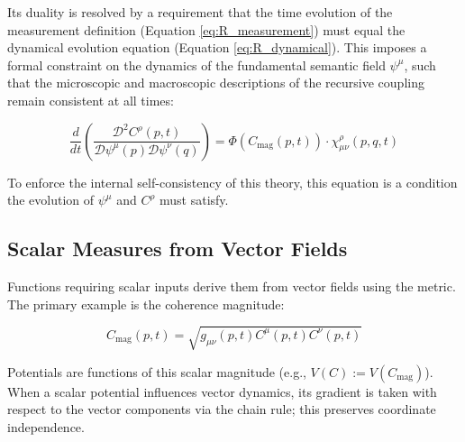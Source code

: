 Its duality is resolved by a requirement that the time evolution of the measurement definition (Equation \ref{eq:R_measurement}) must equal the dynamical evolution equation (Equation \ref{eq:R_dynamical}). This imposes a formal constraint on the dynamics of the fundamental semantic field \(\psi^\mu\), such that the microscopic and macroscopic descriptions of the recursive coupling remain consistent at all times:

\begin{equation}
\label{eq:R_consistency}
\frac{d}{dt} \left( \frac{\mathcal{D}^2 C^\rho(p,t)}{\mathcal{D} \psi^\mu(p) \mathcal{D} \psi^\nu(q)} \right) = \Phi(C_{\mathrm{mag}}(p,t)) \cdot \chi^\rho_{\mu\nu}(p,q,t)
\end{equation}

To enforce the internal self-consistency of this theory, this equation is a condition the evolution of \(\psi^\mu\) and \(C^\rho\) must satisfy.


\subsection{Scalar Measures from Vector Fields}
\label{2.4.8:scalar_measures_from_vector_fields}

Functions requiring scalar inputs derive them from vector fields using the metric. The primary example is the coherence magnitude:

\begin{equation}
C_{\mathrm{mag}}(p,t) = \sqrt{g_{\mu\nu}(p,t) C^\mu(p,t) C^\nu(p,t)}
\end{equation}

Potentials are functions of this scalar magnitude (e.g., \(V(C) := V(C_{\mathrm{mag}})\)). When a scalar potential influences vector dynamics, its gradient is taken with respect to the vector components via the chain rule; this preserves coordinate independence. 